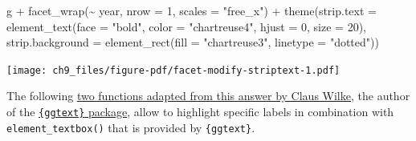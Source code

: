 \documentclass[
  letterpaper,
  DIV=11,
  numbers=noendperiod]{scrreprt}
\newenvironment{Shaded}{\begin{snugshade}}{\end{snugshade}}
\newcommand{\AttributeTok}[1]{\textcolor[rgb]{0.40,0.45,0.13}{#1}}
\newcommand{\DecValTok}[1]{\textcolor[rgb]{0.68,0.00,0.00}{#1}}
\newcommand{\FunctionTok}[1]{\textcolor[rgb]{0.28,0.35,0.67}{#1}}
\newcommand{\NormalTok}[1]{\textcolor[rgb]{0.00,0.23,0.31}{#1}}
\newcommand{\SpecialCharTok}[1]{\textcolor[rgb]{0.37,0.37,0.37}{#1}}
\newcommand{\StringTok}[1]{\textcolor[rgb]{0.13,0.47,0.30}{#1}}
\begin{document}
\begin{Shaded}
\begin{Highlighting}[]
\NormalTok{g }\SpecialCharTok{+} \FunctionTok{facet\_wrap}\NormalTok{(}\SpecialCharTok{\textasciitilde{}}\NormalTok{ year, }\AttributeTok{nrow =} \DecValTok{1}\NormalTok{, }\AttributeTok{scales =} \StringTok{"free\_x"}\NormalTok{) }\SpecialCharTok{+}
  \FunctionTok{theme}\NormalTok{(}\AttributeTok{strip.text =} \FunctionTok{element\_text}\NormalTok{(}\AttributeTok{face =} \StringTok{"bold"}\NormalTok{, }\AttributeTok{color =} \StringTok{"chartreuse4"}\NormalTok{,}
                                  \AttributeTok{hjust =} \DecValTok{0}\NormalTok{, }\AttributeTok{size =} \DecValTok{20}\NormalTok{),}
        \AttributeTok{strip.background =} \FunctionTok{element\_rect}\NormalTok{(}\AttributeTok{fill =} \StringTok{"chartreuse3"}\NormalTok{, }\AttributeTok{linetype =} \StringTok{"dotted"}\NormalTok{))}
\end{Highlighting}
\end{Shaded}

\texttt{[image: ch9\_files/figure-pdf/facet-modify-striptext-1.pdf]}

The following
\href{https://stackoverflow.com/questions/60332202/conditionally-fill-ggtext-text-boxes-in-facet-wrap}{two
functions adapted from this answer by Claus Wilke}, the author of the
\href{https://wilkelab.org/ggtext/}{\texttt{\{ggtext\}} package}, allow
to highlight specific labels in combination with
\texttt{element\_textbox()} that is provided by \texttt{\{ggtext\}}.
\end{document}
